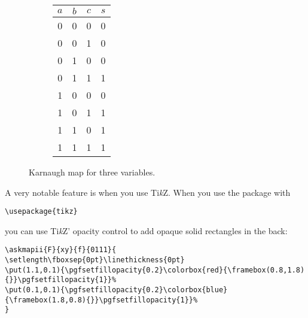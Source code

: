 \documentclass[a4paper,10pt]{ltxdoc}
\begin{document}
\begin{figure}[H]
\begin{subfigure}[c]{0.5\textwidth}
\centering
\askmapunitlength=0.88cm
%
\end{subfigure}%
\begin{subfigure}[c]{0.5\textwidth}
\centering
\begin{tabular}{ccc|c}
$a$ & $b$ & $c$ & $s$ \\ \hline
 0  &  0  &  0  &  0  \\
 0  &  0  &  1  &  0  \\
 0  &  1  &  0  &  0  \\
 0  &  1  &  1  &  1  \\
 1  &  0  &  0  &  0  \\
 1  &  0  &  1  &  1  \\
 1  &  1  &  0  &  1  \\
 1  &  1  &  1  &  1  \\
\end{tabular}
\end{subfigure}%
\bigskip\caption{Karnaugh map for three variables.}
\label{fig:karnaughmajorfunction}
\end{figure}

A very notable feature is when you use Ti\textsl{k}Z. When you use the package with

\begin{verbatim}
\usepackage{tikz}
\end{verbatim}

you can use Ti\textsl{k}Z' opacity control to add opaque solid rectangles in the back:

\begin{verbatim}
\askmapii{F}{xy}{f}{0111}{
\setlength\fboxsep{0pt}\linethickness{0pt}
\put(1.1,0.1){\pgfsetfillopacity{0.2}\colorbox{red}{\framebox(0.8,1.8){}}\pgfsetfillopacity{1}}%
\put(0.1,0.1){\pgfsetfillopacity{0.2}\colorbox{blue}{\framebox(1.8,0.8){}}\pgfsetfillopacity{1}}%
}
\end{verbatim}

\end{document}
